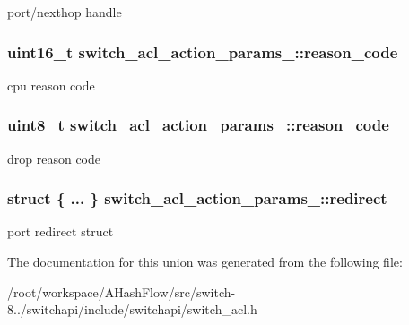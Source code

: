 port/nexthop handle \hypertarget{unionswitch__acl__action__params___a9746d0286a4eb88231f052f4cd82e6d7}{
\subsubsection[{reason\+\_\+code}]{\setlength{\rightskip}{0pt plus 5cm}uint16\+\_\+t switch\+\_\+acl\+\_\+action\+\_\+params\+\_\+\+::reason\+\_\+code}}\label{unionswitch__acl__action__params___a9746d0286a4eb88231f052f4cd82e6d7}
cpu reason code \hypertarget{unionswitch__acl__action__params___a1269fcd1fc7d6d7cf761499bd62954ff}{
\subsubsection[{reason\+\_\+code}]{\setlength{\rightskip}{0pt plus 5cm}uint8\+\_\+t switch\+\_\+acl\+\_\+action\+\_\+params\+\_\+\+::reason\+\_\+code}}\label{unionswitch__acl__action__params___a1269fcd1fc7d6d7cf761499bd62954ff}
drop reason code \hypertarget{unionswitch__acl__action__params___adc73dc53f581c8d332224c64763d55b9}{
\subsubsection[{redirect}]{\setlength{\rightskip}{0pt plus 5cm}struct \{ ... \}   switch\+\_\+acl\+\_\+action\+\_\+params\+\_\+\+::redirect}}\label{unionswitch__acl__action__params___adc73dc53f581c8d332224c64763d55b9}
port redirect struct 

The documentation for this union was generated from the following file\+:\begin{DoxyCompactItemize}
\item 
/root/workspace/\+A\+Hash\+Flow/src/switch-\/8../switchapi/include/switchapi/switch\+\_\+acl.\+h\end{DoxyCompactItemize}
